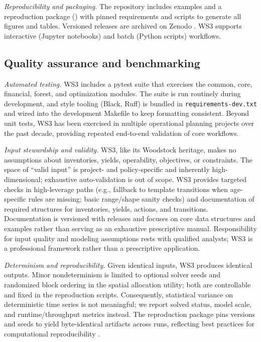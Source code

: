 \documentclass[review]{elsarticle}
\begin{document}
\emph{Reproducibility and packaging.} The repository includes examples and a reproduction package () with pinned requirements and scripts to generate all figures and tables. Versioned releases are archived on Zenodo \citep{ws3_zenodo2025}. WS3 supports interactive (Jupyter notebooks) and batch (Python scripts) workflows.

\subsection{Quality assurance and benchmarking}
\emph{Automated testing.} WS3 includes a pytest suite that exercises the common, core, financial, forest, and optimization modules. The suite is run routinely during development, and style tooling (Black, Ruff) is bundled in \texttt{requirements-dev.txt} and wired into the development Makefile to keep formatting consistent. Beyond unit tests, WS3 has been exercised in multiple operational planning projects over the past decade, providing repeated end-to-end validation of core workflows.

\emph{Input stewardship and validity.} WS3, like its Woodstock heritage, makes no assumptions about inventories, yields, operability, objectives, or constraints. The space of ``valid input'' is project- and policy-specific and inherently high-dimensional; exhaustive auto-validation is out of scope. WS3 provides targeted checks in high-leverage paths (e.g., fallback to template transitions when age-specific rules are missing; basic range/shape sanity checks) and documentation of required structures for inventories, yields, actions, and transitions. Documentation is versioned with releases and focuses on core data structures and examples rather than serving as an exhaustive prescriptive manual. Responsibility for input quality and modeling assumptions rests with qualified analysts; WS3 is a professional framework rather than a prescriptive application.

\emph{Determinism and reproducibility.} Given identical inputs, WS3 produces identical outputs. Minor nondeterminism is limited to optional solver seeds and randomized block ordering in the spatial allocation utility; both are controllable and fixed in the reproduction scripts. Consequently, statistical variance on deterministic time series is not meaningful; we report solved status, model scale, and runtime/throughput metrics instead. The reproduction package pins versions and seeds to yield byte-identical artifacts across runs, reflecting best practices for computational reproducibility \citep{peng2011reproducible}.
\end{document}
